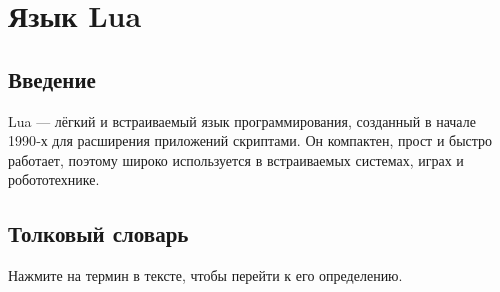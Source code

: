\section{Язык Lua}
\subsection{Введение}
Lua — лёгкий и встраиваемый язык программирования, созданный в начале 1990‑х для расширения приложений скриптами. Он компактен, прост и быстро работает, поэтому широко используется в встраиваемых системах, играх и робототехнике.

\subsection{Толковый словарь}
Нажмите на термин в тексте, чтобы перейти к его определению.
